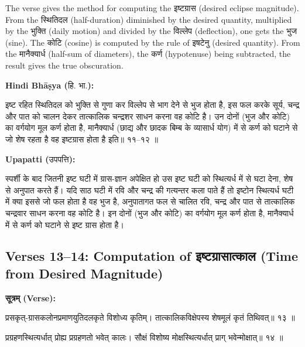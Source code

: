 \documentclass[11pt,a4paper]{article}
\newcommand{\dev}[1]{{\devanagarifont #1}}
\newcommand{\hindi}{\textbf{Hindi Bhāṣya (}\dev{हि. भा.}\textbf{):}\ }
\newcommand{\upapatti}{\textbf{Upapatti (}\dev{उपपत्ति}\textbf{):}\ }
\newenvironment{sanskritverse}{%
  \begin{center}\begin{minipage}{0.9\textwidth}
  \setlength{\leftskip}{1em}
  \setlength{\rightskip}{1em}
  \dev
}{\end{minipage}\end{center}}
\begin{document}
The verse gives the method for computing the \dev{इष्टग्रास} (desired eclipse magnitude).
From the \dev{स्थितिदल} (half-duration) diminished by the desired quantity, multiplied
by the \dev{भुक्ति} (daily motion) and divided by the \dev{विल्लेप} (deflection), one gets
the \dev{भुज} (sine). The \dev{कोटि} (cosine) is computed by the rule of \dev{इषटेनु} (desired quantity).
From the \dev{मानैक्यार्ध} (half-sum of diameters), the \dev{कर्ण} (hypotenuse) being subtracted,
the result gives the true obscuration.

\vspace{0.5em}
\noindent\hindi
\begin{sanskritverse}
इष्ट रहित स्थितिदल को भुक्ति से गुणा कर विल्लेप से भाग देने से भुज होता है, इस फल करके
सूर्य, चन्द्र और पात को चालन देकर तात्कालिक चन्द्रशर साधन करना वह कोटि है। उन दोनों
(भुज और कोटि) का वर्गयोग मूल कर्ण होता है, मानैक्यार्ध (छाद्य और छादक बिम्ब के व्यासार्ध
योग) में से कर्ण को घटाने से जो शेष रहता है वह इष्टग्रास होता है इति॥ ११--१२ ॥
\end{sanskritverse}

\noindent\upapatti
\begin{sanskritverse}
स्पर्शी के बाद जितनी इष्ट घटी में ग्रास-ज्ञान अपेक्षित हो उस इष्ट घटी को स्थित्यर्ध में से घटा
देना, शेष से अनुपात करते हैं। यदि साठ घटी में रवि और चन्द्र की गत्यन्तर कला पाते हैं तो
इष्टोन स्थित्यर्ध घटी में क्या इससे जो फल होता है वह भुज है, अनुपातागत फल से चालित रवि,
चन्द्र और पात से तात्कालिक चन्द्रवार साधन करना वह कोटि है। इन दोनों (भुज और कोटि)
का वर्गयोग मूल कर्ण होता है, मानैक्यार्ध में से कर्ण को घटाने से इष्ट ग्रास होता है।
\end{sanskritverse}

\subsection{Verses 13--14: Computation of \dev{इष्टग्रासात्काल} (Time from Desired Magnitude)}

\vspace{0.5em}
\noindent\textbf{\dev{सूत्रम् (Verse):}}
\begin{sanskritverse}
प्रसकृत्-ग्रासकलोनप्रमाणयुतिदलकृते विशोध्य कृतिम्।
तात्कालिकविक्षेपस्य शेषमूलं कृतं तिथिवत्॥ १३ ॥
\end{sanskritverse}

\begin{sanskritverse}
प्रग्रहणस्थित्यर्धात् प्रोह्य प्रग्रहणतो भवेत् कालः।
सौक्षं विशोष्य मोक्षस्थित्यर्धात् प्राग् भवेन्मोक्षात्॥ १४ ॥
\end{sanskritverse}
\end{document}
